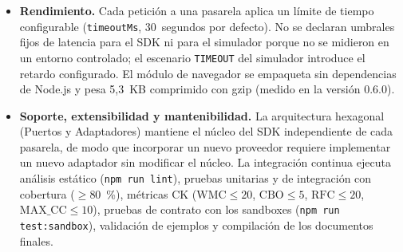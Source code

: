 \begin{itemize}
    \item \textbf{Rendimiento.} Cada petición a una pasarela aplica un límite de tiempo configurable (\texttt{timeoutMs}, 30~segundos por defecto). No se declaran umbrales fijos de latencia para el SDK ni para el simulador porque no se midieron en un entorno controlado; el escenario \texttt{TIMEOUT} del simulador introduce el retardo configurado. El módulo de navegador se empaqueta sin dependencias de Node.js y pesa 5,3~KB comprimido con gzip (medido en la versión 0.6.0).
    \item \textbf{Soporte, extensibilidad y mantenibilidad.} La arquitectura hexagonal (Puertos y Adaptadores) mantiene el núcleo del SDK independiente de cada pasarela, de modo que incorporar un nuevo proveedor requiere implementar un nuevo adaptador sin modificar el núcleo. La integración continua ejecuta análisis estático (\texttt{npm run lint}), pruebas unitarias y de integración con cobertura ($\ge 80$~\%), métricas CK ($\mathrm{WMC} \le 20$, $\mathrm{CBO} \le 5$, $\mathrm{RFC} \le 20$, $\mathrm{MAX\_CC} \le 10$), pruebas de contrato con los sandboxes (\texttt{npm run test:sandbox}), validación de ejemplos y compilación de los documentos finales.
\end{itemize}

